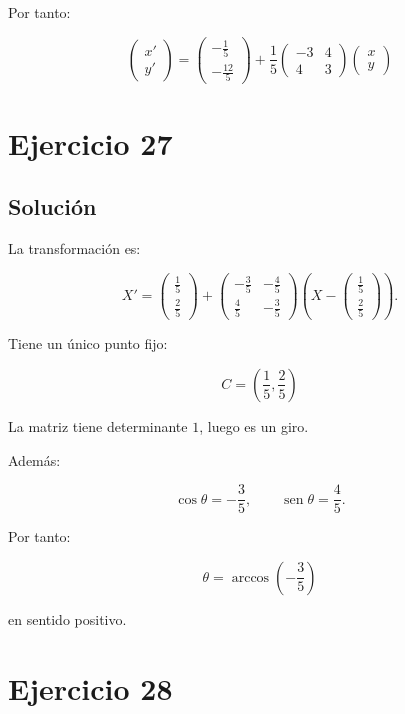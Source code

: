 \documentclass[11pt,a4paper]{article}
\newcommand{\sen}{\operatorname{sen}}
\begin{document}
Por tanto:

\[
\boxed{
\begin{pmatrix}
x'\\
y'
\end{pmatrix}
=
\begin{pmatrix}
-\frac15\\[1mm]
-\frac{12}{5}
\end{pmatrix}
+
\frac15
\begin{pmatrix}
-3&4\\
4&3
\end{pmatrix}
\begin{pmatrix}
x\\
y
\end{pmatrix}
}
\]

\section{Ejercicio 27}
\subsection{Solución}

La transformación es:

\[
X'
=
\begin{pmatrix}
\frac15\\[1mm]
\frac25
\end{pmatrix}
+
\begin{pmatrix}
-\frac35&-\frac45\\[1mm]
\frac45&-\frac35
\end{pmatrix}
\left(
X-
\begin{pmatrix}
\frac15\\[1mm]
\frac25
\end{pmatrix}
\right).
\]

Tiene un único punto fijo:

\[
\boxed{
C=
\left(
\frac15,\frac25
\right)
}
\]

La matriz tiene determinante \(1\), luego es un giro.

Además:

\[
\cos\theta=-\frac35,
\qquad
\sen\theta=\frac45.
\]

Por tanto:

\[
\boxed{
\theta
=
\arccos\left(-\frac35\right)
}
\]

en sentido positivo.

\section{Ejercicio 28}
\end{document}
